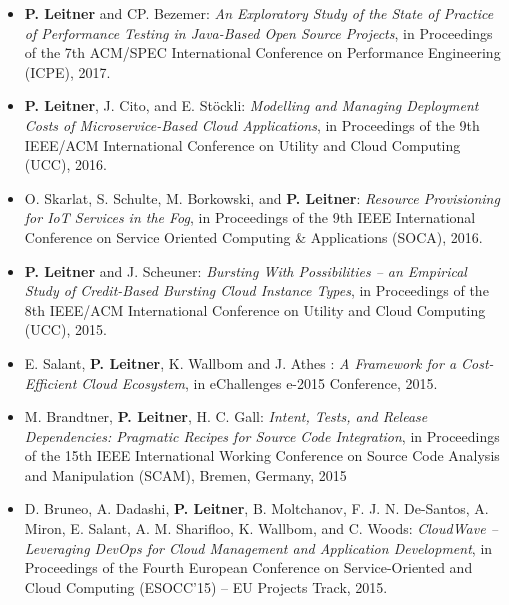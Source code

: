 \documentclass[paper=letter,fontsize=11pt]{scrartcl} %
\begin{document}
\begin{itemize}
        \item \textbf{P. Leitner} and CP. Bezemer: \emph{An Exploratory Study of the State of Practice of Performance Testing in Java-Based Open Source Projects}, in  Proceedings of the 7th ACM/SPEC International Conference on Performance Engineering (ICPE), 2017.
	\item \textbf{P. Leitner}, J. Cito, and E. St\"ockli: \emph{Modelling and Managing Deployment Costs of Microservice-Based Cloud Applications}, in Proceedings of the 9th IEEE/ACM International Conference on Utility and Cloud Computing (UCC), 2016.
  \item O. Skarlat, S. Schulte, M. Borkowski, and \textbf{P. Leitner}: \emph{Resource Provisioning for IoT Services in the Fog}, in Proceedings of the 9th IEEE International Conference on Service Oriented Computing \& Applications (SOCA), 2016.
	\item \textbf{P. Leitner} and J. Scheuner: \emph{Bursting With Possibilities -- an Empirical Study of Credit-Based Bursting Cloud Instance Types}, in Proceedings of the 8th IEEE/ACM International Conference on Utility and Cloud Computing (UCC), 2015.
  \item E. Salant, \textbf{P. Leitner}, K. Wallbom and J. Athes : \emph{A Framework for a Cost-Efficient Cloud Ecosystem}, in eChallenges e-2015 Conference, 2015.
  \item M. Brandtner, \textbf{P. Leitner}, H. C. Gall: \emph{Intent, Tests, and Release Dependencies: Pragmatic Recipes for Source Code Integration}, in Proceedings of the 15th IEEE International Working Conference on Source Code Analysis and Manipulation (SCAM), Bremen, Germany, 2015
  \item  D. Bruneo, A. Dadashi, \textbf{P. Leitner}, B. Moltchanov, F. J. N. De-Santos, A. Miron, E. Salant, A. M. Sharifloo, K. Wallbom, and C. Woods: \emph{CloudWave – Leveraging DevOps for Cloud Management and Application Development}, in Proceedings of the Fourth European Conference on Service-Oriented and Cloud Computing (ESOCC’15) – EU Projects Track, 2015.
  \begin{shaded}

\end{shaded}
\end{itemize}
\end{document}

